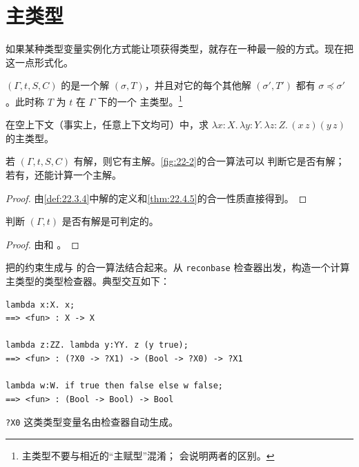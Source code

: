 \section{主类型}
\label{sec:22.5}

如果某种类型变量实例化方式能让项获得类型，就存在一种最一般的方式。现在把
这一点形式化。

\begin{definition}
\label{def:22.5.1}
\((\Gamma,t,S,C)\) 的是一个解
\((\sigma,T)\)，并且对它的每个其他解 \((\sigma',T')\) 都有
\(\sigma\preceq\sigma'\)。此时称 \(T\) 为 \(t\) 在 \(\Gamma\) 下的一个
主类型。\footnote{主类型不要与相近的“主赋型”混淆；
会说明两者的区别。}
\end{definition}

\begin{exercise}[\(\star\), \(\nrightarrow\)]
\label{ex:22.5.2}
在空上下文（事实上，任意上下文均可）中，求
\(\lambda x:X.\,\lambda y:Y.\,\lambda z:Z.\,(x\,z)(y\,z)\)
的主类型。
\end{exercise}

\begin{theorem}[主类型]
\label{thm:22.5.3}
若 \((\Gamma,t,S,C)\) 有解，则它有主解。\cref{fig:22-2}的合一算法可以
判断它是否有解；若有，还能计算一个主解。
\end{theorem}

\begin{proof}
由\cref{def:22.3.4}中解的定义和\cref{thm:22.4.5}的合一性质直接得到。
\end{proof}

\begin{corollary}
\label{cor:22.5.4}
判断 \((\Gamma,t)\) 是否有解是可判定的。
\end{corollary}

\begin{proof}
由和
。
\end{proof}

\begin{exercise}
\label{ex:22.5.5}
把的约束生成与
的合一算法结合起来。从
\texttt{reconbase} 检查器出发，构造一个计算主类型的类型检查器。典型交互如下：
\begin{lstlisting}
lambda x:X. x;
==> <fun> : X -> X

lambda z:ZZ. lambda y:YY. z (y true);
==> <fun> : (?X0 -> ?X1) -> (Bool -> ?X0) -> ?X1

lambda w:W. if true then false else w false;
==> <fun> : (Bool -> Bool) -> Bool
\end{lstlisting}
\texttt{?X0} 这类类型变量名由检查器自动生成。
\end{exercise}

